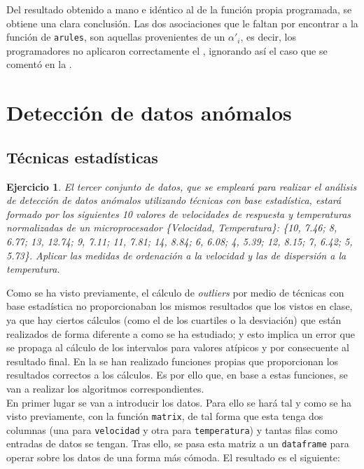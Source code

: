 \documentclass[12pt]{report}\usepackage[]{graphicx}\usepackage[dvipsnames]{xcolor}
\newtheorem{exercise}{Ejercicio}[section]
\begin{document}
			Del resultado obtenido a mano e idéntico al de la función propia programada, se obtiene una clara conclusión. Las dos asociaciones que le faltan por encontrar a la función de \texttt{arules}, son aquellas provenientes de un $\alpha'_i$, es decir, los programadores no aplicaron correctamente el , ignorando así el caso que se comentó en la . 
		
		\section{Detección de datos anómalos}
		
			\subsection{Técnicas estadísticas}
			
				\begin{exercise}
					El tercer conjunto de datos, que se empleará para realizar el análisis de detección de datos anómalos utilizando técnicas con base estadística, estará formado por los siguientes 10 valores de velocidades de respuesta y temperaturas normalizadas de un microprocesador \{Velocidad, Temperatura\}: \{10, 7.46; 8, 6.77; 13, 12.74; 9, 7.11; 11, 7.81; 14, 8.84; 6, 6.08; 4, 5.39; 12, 8.15; 7, 6.42; 5, 5.73\}. Aplicar las medidas de ordenación a la velocidad y las de dispersión a la temperatura.
				\end{exercise}
				
				Como se ha visto previamente, el cálculo de \textit{outliers} por medio de técnicas con base estadística no proporcionaban los mismos resultados que los vistos en clase, ya que hay ciertos cálculos (como el de los cuartiles o la desviación) que están realizados de forma diferente a como se ha estudiado; y esto implica un error que se propaga al cálculo de los intervalos para valores atípicos y por consecuente al resultado final. En la  se han realizado funciones propias que proporcionan los resultados correctos a los cálculos. Es por ello que, en base a estas funciones, se van a realizar los algoritmos correspondientes.\\
				
				En primer lugar se van a introducir los datos. Para ello se hará tal y como se ha visto previamente, con la función \texttt{matrix}, de tal forma que esta tenga dos columnas (una para \texttt{velocidad} y otra para \texttt{temperatura}) y tantas filas como entradas de datos se tengan. Tras ello, se pasa esta matriz a un \texttt{dataframe} para operar sobre los datos de una forma más cómoda. El resultado es el siguiente: 
				
\end{document}
